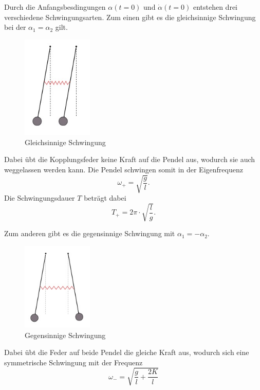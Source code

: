 Durch die Anfangsbesdingungen $\alpha (t=0)$ und $\dot{\alpha}(t=0)$ entstehen drei verschiedene
Schwingungsarten.
Zum einen gibt es die gleichsinnige Schwingung bei der $\alpha_1 = \alpha_2$ gilt.
\begin{figure}
  \centering
  \includegraphics[width= 0.3\textwidth]{bilder/gleichsinnig.jpg}
  \caption{Gleichsinnige Schwingung\,\cite{106}}
\end{figure}
Dabei übt die Kopplungsfeder keine Kraft auf die Pendel aus, wodurch sie auch weggelassen
werden kann. Die Pendel schwingen somit in der Eigenfrequenz
\begin{equation}
  \omega_+ = \sqrt{\frac{g}{l}}
  \label{eqn:w+}.
\end{equation}
Die Schwingungsdauer $T$ beträgt dabei
\begin{equation}
  T_+ = 2 \pi \cdot \sqrt{\frac{l}{g}}
  \label{eqn:T+}.
\end{equation}
\par
Zum anderen gibt es die gegensinnige Schwingung mit $\alpha_1 = -\alpha_2$.
\begin{figure}
  \centering
  \includegraphics[width= 0.3\textwidth]{bilder/gegensinnig.jpg}
  \caption{Gegensinnige Schwingung\,\cite{106}}
\end{figure}
Dabei übt die Feder auf beide Pendel die gleiche Kraft aus, wodurch sich eine symmetrische
Schwingung mit der Frequenz
\begin{equation}
  \omega_-= \sqrt{\frac{g}{l}+\frac{2K}{l}}
  \label{eqn:w-}
\end{equation}
